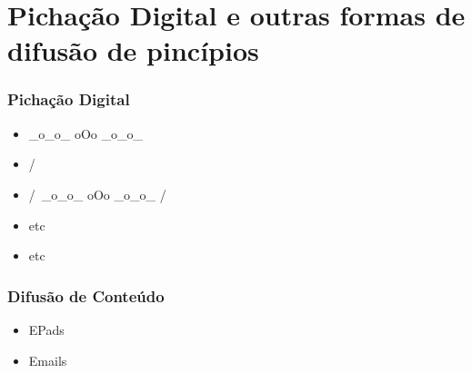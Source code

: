 \chapter{Pichação Digital e outras formas de difusão de pincípios}
\label{cap:pichacao}

\subsection{Pichação Digital}
\begin{itemize}
    \item \_o\_o\_ oOo \_o\_o\_

    \item /\/\/\/\/\/\/\/\/\/\

    \item /\/\/\/\/\ \_o\_o\_ oOo \_o\_o\_ /\/\/\/\/\

    \item etc

    \item etc

\end{itemize}

\subsection{Difusão de Conteúdo}

\begin{itemize}
    \item EPads

    \item Emails
\end{itemize}